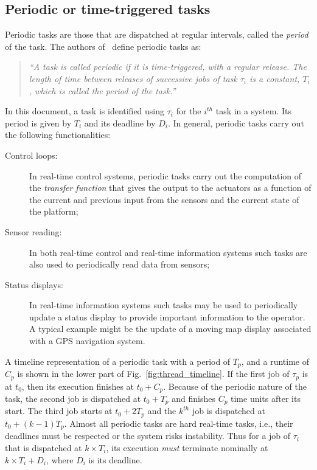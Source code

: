 \subsection{Periodic or time-triggered tasks}
Periodic tasks are those that are dispatched at regular intervals,
called the \emph{period} of the task. The authors of~\cite{sha@rts04}
define periodic tasks as:

\begin{quote}
 \emph{``A task is called periodic if it is time-triggered, with a
   regular release. The length of time between releases of successive
   jobs of task $\tau_i$ is a constant, $T_i$, which is called the
   period of the task.''} 
\end{quote}

In this document, a task is identified using $\tau_i$ for the $i^{th}$
task in a system. Its period is given by $T_i$ and its deadline by
$D_i$. In general, periodic tasks carry out the following
functionalities:

\begin{description}
\item[Control loops:]{In real-time control systems, periodic tasks
  carry out the computation of the \emph{transfer function} that gives
  the output to the actuators as a function of the current and
  previous input from the sensors and the current state of the
  platform;}
\item[Sensor reading:]{In both real-time control and real-time
  information systems such tasks are also used to periodically read
  data from sensors;}
\item[Status displays:]{In real-time information systems such tasks may
  be used to periodically update a status display to provide important
  information to the operator. A typical example might be the update
  of a moving map display associated with a GPS navigation system.}
\end{description}

A timeline representation of a periodic task with a period of $T_p$,
and a runtime of $C_p$ is shown in the lower part of
Fig.~\ref{fig:thread_timeline}. If the first job of $\tau_p$ is at
$t_0$, then its execution finishes at $t_0 + C_p$. Because of the
periodic nature of the task, the second job is dispatched at $t_0 +
T_p$ and finishes $C_p$ time units after its start. The third job
starts at $t_0 + 2T_p$ and the $k^{th}$ job is dispatched at $t_0 +
(k-1)T_p$. Almost all periodic tasks are hard real-time tasks, i.e.,
their deadlines must be respected or the system risks
instability. Thus for a job of $\tau_i$ that is dispatched at $k\times
T_i$, its execution \emph{must} terminate nominally at $k\times T_i +
D_i$, where $D_i$ is its deadline.

